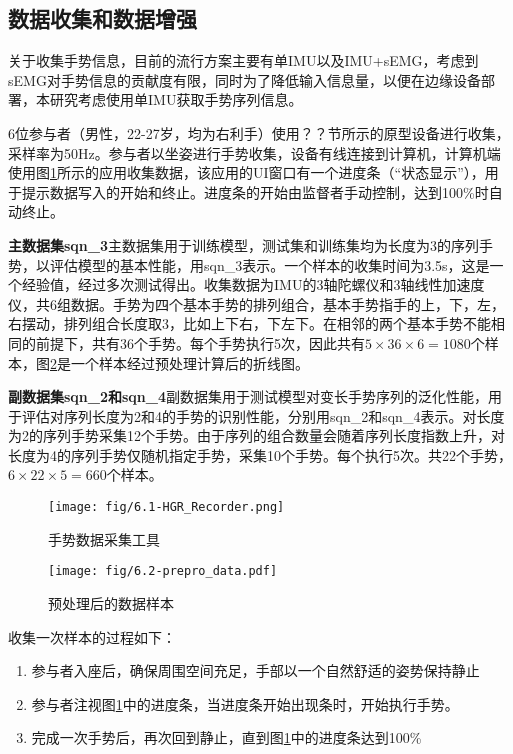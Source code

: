 \subsection{数据收集和数据增强}\label{ssec:data_clct}

关于收集手势信息，目前的流行方案主要有单IMU以及IMU+sEMG，考虑到sEMG对手势信息的贡献度有限\cites{li2022research}，同时为了降低输入信息量，以便在边缘设备部署，本研究考虑使用单IMU获取手势序列信息。

6位参与者（男性，22-27岁，均为右利手）使用？？节所示的原型设备进行收集，采样率为50Hz。参与者以坐姿进行手势收集，设备有线连接到计算机，计算机端使用图\ref{fig:HGR_Recorder}所示的应用收集数据，该应用的UI窗口有一个进度条（“状态显示”），用于提示数据写入的开始和终止。进度条的开始由监督者手动控制，达到100\%时自动终止。

\textbf{主数据集sqn\_3}\hspace{5pt}主数据集用于训练模型，测试集和训练集均为长度为3的序列手势，以评估模型的基本性能，用sqn\_3表示。一个样本的收集时间为3.5s，这是一个经验值，经过多次测试得出。收集数据为IMU的3轴陀螺仪和3轴线性加速度仪，共6组数据。手势为四个基本手势的排列组合，基本手势指手的上，下，左，右摆动，排列组合长度取3，比如上下右，下左下。在相邻的两个基本手势不能相同的前提下，共有36个手势。每个手势执行5次，因此共有$5\times 36\times 6 = 1080$个样本，图\ref{fig:6.2-pre_pro_data}是一个样本经过预处理计算后的折线图。

\textbf{副数据集sqn\_2和sqn\_4}\hspace{5pt}副数据集用于测试模型对变长手势序列的泛化性能，用于评估对序列长度为2和4的手势的识别性能，分别用sqn\_2和sqn\_4表示。对长度为2的序列手势采集12个手势。由于序列的组合数量会随着序列长度指数上升，对长度为4的序列手势仅随机指定手势，采集10个手势。每个执行5次。共22个手势，$6\times 22\times 5=660$个样本。

\begin{figure}[t]
    \centering
    \texttt{[image: fig/6.1-HGR\_Recorder.png]}
    \caption{手势数据采集工具}
    \label{fig:HGR_Recorder}
\end{figure}

\begin{figure}[t]
    \centering
    \texttt{[image: fig/6.2-prepro\_data.pdf]}
    \caption{预处理后的数据样本}
    \label{fig:6.2-pre_pro_data}
\end{figure}

收集一次样本的过程如下：

\begin{enumerate}
    \item 参与者入座后，确保周围空间充足，手部以一个自然舒适的姿势保持静止
    \item 参与者注视图\ref{fig:HGR_Recorder}中的进度条，当进度条开始出现条时，开始执行手势。
    \item 完成一次手势后，再次回到静止，直到图\ref{fig:HGR_Recorder}中的进度条达到100\%
\end{enumerate}

